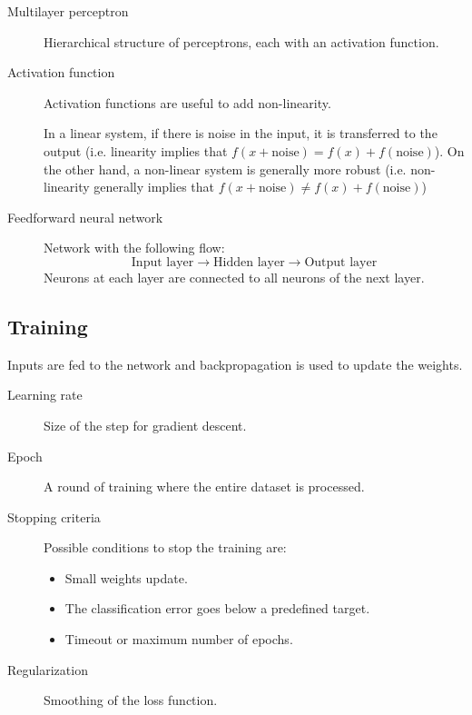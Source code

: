 \begin{description}
    \item[Multilayer perceptron] 
        Hierarchical structure of perceptrons, each with an activation function.

    \item[Activation function] 
        Activation functions are useful to add non-linearity.

        \begin{remark}
            In a linear system, if there is noise in the input, it is transferred to the output 
            (i.e. linearity implies that $f(x + \text{noise}) = f(x) + f(\text{noise})$).
            On the other hand, a non-linear system is generally more robust 
            (i.e. non-linearity generally implies that $f(x + \text{noise}) \neq f(x) + f(\text{noise})$)
        \end{remark}

    \item[Feedforward neural network] 
        Network with the following flow:
        \[ \text{Input layer} \rightarrow \text{Hidden layer} \rightarrow \text{Output layer} \]
        Neurons at each layer are connected to all neurons of the next layer.
\end{description}


\subsection{Training}
Inputs are fed to the network and backpropagation is used to update the weights.

\begin{description}
    \item[Learning rate] 
        Size of the step for gradient descent.

    \item[Epoch]  
        A round of training where the entire dataset is processed.

    \item[Stopping criteria] 
        Possible conditions to stop the training are:
        \begin{itemize}
            \item Small weights update.
            \item The classification error goes below a predefined target.
            \item Timeout or maximum number of epochs.
        \end{itemize}

    \item[Regularization] 
        Smoothing of the loss function.
\end{description}



